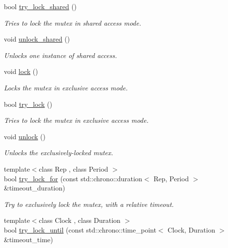 \begin{DoxyCompactItemize}
bool \hyperlink{classcpen333_1_1process_1_1impl_1_1shared__mutex__shared_a382dfc90cc323e70879de8e69bcb7e24}{try\+\_\+lock\+\_\+shared} ()
\begin{DoxyCompactList}\small\item\em Tries to lock the mutex in shared access mode. \end{DoxyCompactList}\item 
void \hyperlink{classcpen333_1_1process_1_1impl_1_1shared__mutex__shared_a4a7331e891ef08ffddda51ab5722fac6}{unlock\+\_\+shared} ()
\begin{DoxyCompactList}\small\item\em Unlocks one instance of shared access. \end{DoxyCompactList}\item 
void \hyperlink{classcpen333_1_1process_1_1impl_1_1shared__mutex__shared_a48a55c1a0bc4465ce3042eac361b674c}{lock} ()
\begin{DoxyCompactList}\small\item\em Locks the mutex in exclusive access mode. \end{DoxyCompactList}\item 
bool \hyperlink{classcpen333_1_1process_1_1impl_1_1shared__mutex__shared_a14e358b1ecbdebd69fb89fdc3b2a4f61}{try\+\_\+lock} ()
\begin{DoxyCompactList}\small\item\em Tries to lock the mutex in exclusive access mode. \end{DoxyCompactList}\item 
void \hyperlink{classcpen333_1_1process_1_1impl_1_1shared__mutex__shared_aa5a87d5886497263cc6b0f0a4d79f15c}{unlock} ()
\begin{DoxyCompactList}\small\item\em Unlocks the exclusively-\/locked mutex. \end{DoxyCompactList}\item 
{\footnotesize template$<$class Rep , class Period $>$ }\\bool \hyperlink{classcpen333_1_1process_1_1impl_1_1shared__mutex__shared_a4437c703911edfa03d9cc759fbc6f9c3}{try\+\_\+lock\+\_\+for} (const std\+::chrono\+::duration$<$ Rep, Period $>$ \&timeout\+\_\+duration)
\begin{DoxyCompactList}\small\item\em Try to exclusively lock the mutex, with a relative timeout. \end{DoxyCompactList}\item 
{\footnotesize template$<$class Clock , class Duration $>$ }\\bool \hyperlink{classcpen333_1_1process_1_1impl_1_1shared__mutex__shared_a3aeb0499325e4a073de1877f0a41f2bb}{try\+\_\+lock\+\_\+until} (const std\+::chrono\+::time\+\_\+point$<$ Clock, Duration $>$ \&timeout\+\_\+time)

\end{DoxyCompactItemize}
